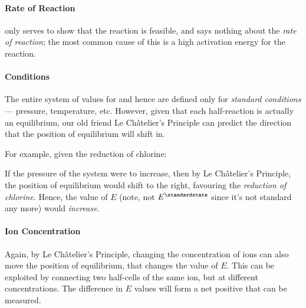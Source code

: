 				\paragraph{Rate of Reaction}

				\Ecell{} only serves to show that the reaction is feasible, and says nothing about the \textit{rate of reaction};
				the most common cause of this is a high activation energy for the reaction.


				\paragraph{Conditions}

				The entire system of values for \Eo{} and hence \Ecell{} are defined only for \textit{standard conditions} --- pressure,
				temperature, etc. However, given that each half-reaction is actually an equilibrium, our old friend Le Châtelier's Principle
				can predict the direction that the position of equilibrium will shift in.

				For example, given the reduction of chlorine:


				If the pressure of the system were to increase, then by Le Châtelier's Principle, the position of equilibrium would shift to
				the right, favouring the \textit{reduction of chlorine}. Hence, the value of $E$ (note, not $E^{\stdst}$ since it's
				not standard any more) would \textit{increase}.



				\paragraph{Ion Concentration}

				Again, by Le Châtelier's Principle, changing the concentration of ions can also move the position of equilibrium, that changes
				the value of $E$. This can be exploited by connecting two half-cells of the same ion, but at different concentrations. The
				difference in $E$ values will form a net positive \Ecell{} that can be measured.


